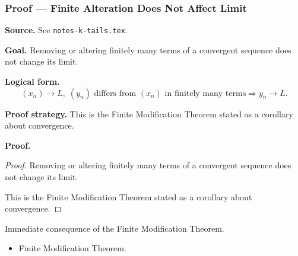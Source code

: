 
\clearpage
{}
\hypertarget{proof-RA-ABB-C-finite-alteration}{}

\subsubsection[Finite Alteration Does Not Affect Limit]{Proof --- Finite Alteration Does Not Affect Limit}

\bigskip

\noindent
\textbf{Source.}
See \texttt{notes-k-tails.tex}.

\vspace{0.75em}

\noindent
\textbf{Goal.}
Removing or altering finitely many terms of a convergent sequence does not change its limit.

\vspace{0.75em}

\noindent
\textbf{Logical form.}
\[
  (x_n) \to L,\; (y_n) \text{ differs from } (x_n) \text{ in finitely many terms} \Rightarrow y_n \to L.
\]

\vspace{0.75em}

\noindent
\textbf{Proof strategy.}
This is the Finite Modification Theorem stated as a corollary about convergence.

\vspace{0.75em}

\noindent
\textbf{Proof.}
\begin{proof}
\Claim Removing or altering finitely many terms of a convergent sequence does not change its limit.

\Given 

\Goal 

\Strategy This is the Finite Modification Theorem stated as a corollary about convergence.

\medskip


\end{proof}

\begin{remark*}
Immediate consequence of the Finite Modification Theorem.
\end{remark*}

\begin{remark*}[Dependencies]
\begin{itemize}
  \item Finite Modification Theorem.
\end{itemize}
\end{remark*}
